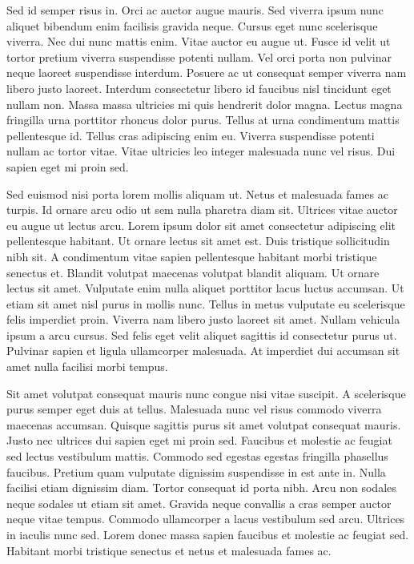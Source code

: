 \documentclass[11pt,a4paper]{article}
\begin{document}
Sed id semper risus in. Orci ac auctor augue mauris. Sed viverra ipsum nunc aliquet bibendum enim facilisis gravida neque. Cursus eget nunc scelerisque viverra. Nec dui nunc mattis enim. Vitae auctor eu augue ut. Fusce id velit ut tortor pretium viverra suspendisse potenti nullam. Vel orci porta non pulvinar neque laoreet suspendisse interdum. Posuere ac ut consequat semper viverra nam libero justo laoreet. Interdum consectetur libero id faucibus nisl tincidunt eget nullam non. Massa massa ultricies mi quis hendrerit dolor magna. Lectus magna fringilla urna porttitor rhoncus dolor purus. Tellus at urna condimentum mattis pellentesque id. Tellus cras adipiscing enim eu. Viverra suspendisse potenti nullam ac tortor vitae. Vitae ultricies leo integer malesuada nunc vel risus. Dui sapien eget mi proin sed.

Sed euismod nisi porta lorem mollis aliquam ut. Netus et malesuada fames ac turpis. Id ornare arcu odio ut sem nulla pharetra diam sit. Ultrices vitae auctor eu augue ut lectus arcu. Lorem ipsum dolor sit amet consectetur adipiscing elit pellentesque habitant. Ut ornare lectus sit amet est. Duis tristique sollicitudin nibh sit. A condimentum vitae sapien pellentesque habitant morbi tristique senectus et. Blandit volutpat maecenas volutpat blandit aliquam. Ut ornare lectus sit amet. Vulputate enim nulla aliquet porttitor lacus luctus accumsan. Ut etiam sit amet nisl purus in mollis nunc. Tellus in metus vulputate eu scelerisque felis imperdiet proin. Viverra nam libero justo laoreet sit amet. Nullam vehicula ipsum a arcu cursus. Sed felis eget velit aliquet sagittis id consectetur purus ut. Pulvinar sapien et ligula ullamcorper malesuada. At imperdiet dui accumsan sit amet nulla facilisi morbi tempus.

Sit amet volutpat consequat mauris nunc congue nisi vitae suscipit. A scelerisque purus semper eget duis at tellus. Malesuada nunc vel risus commodo viverra maecenas accumsan. Quisque sagittis purus sit amet volutpat consequat mauris. Justo nec ultrices dui sapien eget mi proin sed. Faucibus et molestie ac feugiat sed lectus vestibulum mattis. Commodo sed egestas egestas fringilla phasellus faucibus. Pretium quam vulputate dignissim suspendisse in est ante in. Nulla facilisi etiam dignissim diam. Tortor consequat id porta nibh. Arcu non sodales neque sodales ut etiam sit amet. Gravida neque convallis a cras semper auctor neque vitae tempus. Commodo ullamcorper a lacus vestibulum sed arcu. Ultrices in iaculis nunc sed. Lorem donec massa sapien faucibus et molestie ac feugiat sed. Habitant morbi tristique senectus et netus et malesuada fames ac.
\end{document}
